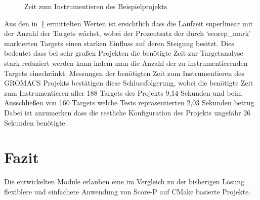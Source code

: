 \documentclass[german,proseminar,hyperref,utf8]{zihpub}
\begin{document}
    \begin{figure}
        \begin{center}
            \caption{Zeit zum Instrumentieren des Beispielprojekts}
            \label{fig:runtime}
        \end{center}
    \end{figure}

    Aus den in~\ref{fig:runtime} ermittelten Werten ist ersichtlich dass die Laufzeit superlinear
    mit der Anzahl der Targets wächst, wobei der Prozentsatz der durch `scorep\_mark' markierten Targets
    einen starken Einfluss auf deren Steigung besitzt.
    Dies bedeutet dass bei sehr gro{\ss}en Projekten die benötigte Zeit zur Targetanalyse stark reduziert
    werden kann indem man die Anzahl der zu instrumentierenden Targets einschränkt.
    Messungen der benötigten Zeit zum Instrumentieren des GROMACS Projekts bestätigen diese Schlussfolgerung,
    wobei die benötigte Zeit zum Instrumentieren aller 188 Targets des Projekts 9,14 Sekunden und beim
    Ausschlie{\ss}en von 160 Targets welche Tests repräsentierten 2,03 Sekunden betrug.
    Dabei ist anzumerken dass die restliche Konfiguration des Projekts ungefähr 26 Sekunden benötigte.

    \newpage
    \section{Fazit}
    Die entwickelten Module erlauben eine im Vergleich zu der bisherigen Lösung flexiblere und einfachere
    Anwendung von Score-P auf CMake basierte Projekte.
\end{document}
